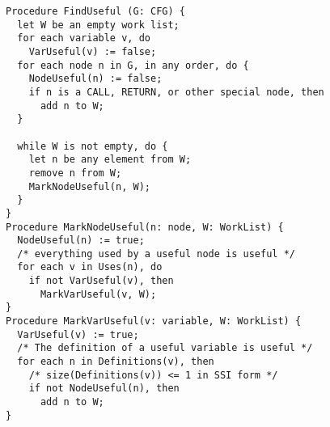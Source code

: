 \begin{verbatim}
Procedure FindUseful (G: CFG) {
  let W be an empty work list;
  for each variable v, do
    VarUseful(v) := false;
  for each node n in G, in any order, do {
    NodeUseful(n) := false;
    if n is a CALL, RETURN, or other special node, then
      add n to W;
  }

  while W is not empty, do {
    let n be any element from W;
    remove n from W;
    MarkNodeUseful(n, W);
  }
}
Procedure MarkNodeUseful(n: node, W: WorkList) {
  NodeUseful(n) := true;
  /* everything used by a useful node is useful */
  for each v in Uses(n), do
    if not VarUseful(v), then
      MarkVarUseful(v, W);
}
Procedure MarkVarUseful(v: variable, W: WorkList) {
  VarUseful(v) := true;
  /* The definition of a useful variable is useful */
  for each n in Definitions(v), then
    /* size(Definitions(v)) <= 1 in SSI form */
    if not NodeUseful(n), then
      add n to W;
}
\end{verbatim}